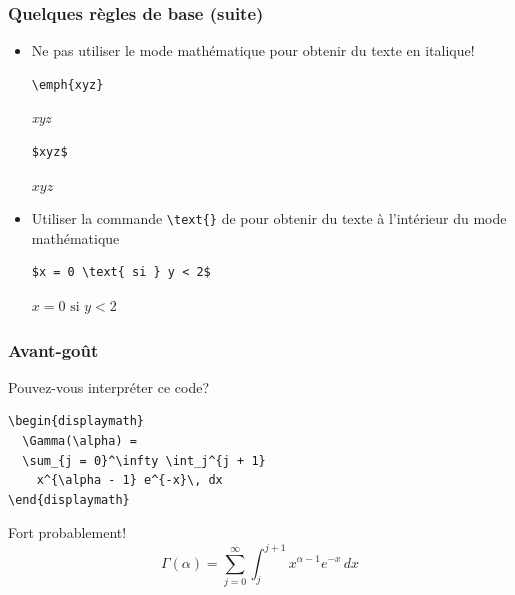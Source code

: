 \begin{frame}[fragile]
  \frametitle{Quelques règles de base (suite)}
  \begin{itemize}
  \item \alert{Ne pas} utiliser le mode mathématique pour obtenir du
    texte en italique!
    \begin{demo}
      \begin{texample}
\begin{lstlisting}
\emph{xyz}
\end{lstlisting}
        \producing
        \rmfamily\emph{xyz}
      \end{texample}
      \begin{texample}
\begin{lstlisting}
$xyz$
\end{lstlisting}
        \producing
        $xyz$
      \end{texample}
    \end{demo}
  \item Utiliser la commande \verb=\text{}= de  pour
    obtenir du texte à l'intérieur du mode mathématique
    \begin{demo}
      \begin{texample}
\begin{lstlisting}
$x = 0 \text{ si } y < 2$
\end{lstlisting}
        \producing
        $x = 0 \text{ si } y < 2$
      \end{texample}
    \end{demo}
  \end{itemize}
\end{frame}

\begin{frame}[fragile]
  \frametitle{Avant-goût}

  Pouvez-vous interpréter ce code?
\begin{lstlisting}
\begin{displaymath}
  \Gamma(\alpha) =
  \sum_{j = 0}^\infty \int_j^{j + 1}
    x^{\alpha - 1} e^{-x}\, dx
\end{displaymath}
\end{lstlisting}
  \vspace{18pt}
  \pause

  Fort probablement!
  \begin{displaymath}
    \Gamma(\alpha) =
    \sum_{j = 0}^\infty \int_j^{j + 1} x^{\alpha - 1} e^{-x}\, dx
  \end{displaymath}
\end{frame}

